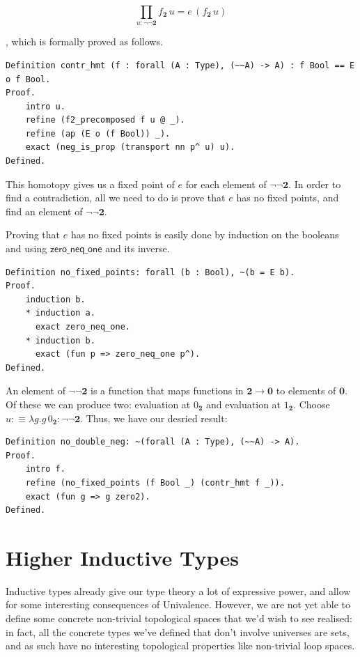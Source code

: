 \documentclass[12 pt]{amsart}
\theoremstyle{definition}
\theoremstyle{remark}
\newcommand{\bool}{{\mathbf{2}}}
\newcommand{\boolone}{1_\bool}
\newcommand{\boolzero}{0_\bool}
\newcommand{\zero}{{\mathbf{0}}}
\newcommand{\no}{\lnot}
\newcommand{\zeroneqone}{{\mathsf{zero\_neq\_one}}}
\begin{document}
\[\prod_{u : \no\no\bool} f_\bool\, u = e \,(f_\bool \, u)\]

, which is formally proved as follows.

\begin{lstlisting}
Definition contr_hmt (f : forall (A : Type), (~~A) -> A) : f Bool == E o f Bool.
Proof.
    intro u.
    refine (f2_precomposed f u @ _).
    refine (ap (E o (f Bool)) _).
    exact (neg_is_prop (transport nn p^ u) u).
Defined.
\end{lstlisting}

This homotopy gives us a fixed point of $e$ for each element of $\no\no\bool$. In order to find a contradiction, all we need to do is prove that $e$ has no fixed points, and find an element of $\no\no\bool$. 

Proving that $e$ has no fixed points is easily done by induction on the booleans and using $\zeroneqone$ and its inverse.


\begin{lstlisting}
Definition no_fixed_points: forall (b : Bool), ~(b = E b).
Proof.
    induction b.
    * induction a.
      exact zero_neq_one.
    * induction b.
      exact (fun p => zero_neq_one p^).
Defined.
\end{lstlisting}

An element of $\no\no\bool$ is a function that maps functions in $\bool \to \zero$ to elements of $\zero$. Of these we can produce two: evaluation at $\boolzero$ and evaluation at $\boolone$. Choose $u :\equiv \lambda g. g\,\boolzero : \no\no\bool$. Thus, we have our desried result:

\begin{lstlisting}
Definition no_double_neg: ~(forall (A : Type), (~~A) -> A).
Proof.
    intro f.
    refine (no_fixed_points (f Bool _) (contr_hmt f _)).
    exact (fun g => g zero2).
Defined.
\end{lstlisting}


\section {Higher Inductive Types}
Inductive types already give our type theory a lot of expressive power, and allow for some interesting consequences of Univalence. However, we are not yet able to define some concrete non-trivial topological spaces that we'd wish to see realised: in fact, all the concrete types we've defined that don't involve universes are sets, and as such have no interesting topological properties like non-trivial loop spaces. 
\end{document}
